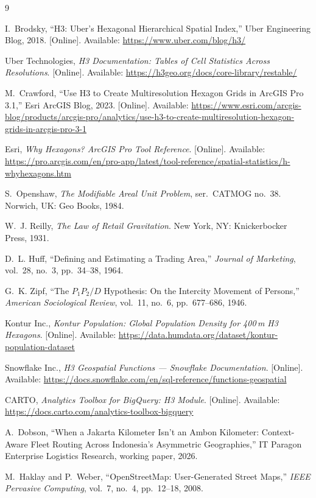 \documentclass[11pt,a4paper,twocolumn]{article}
\begin{document}
\clearpage
\begin{thebibliography}{9}
\small

I.~Brodsky,
``H3: Uber's Hexagonal Hierarchical Spatial Index,''
Uber Engineering Blog, 2018.
[Online]. Available: \url{https://www.uber.com/blog/h3/}

Uber Technologies,
\emph{H3 Documentation: Tables of Cell Statistics Across Resolutions}.
[Online]. Available: \url{https://h3geo.org/docs/core-library/restable/}

M.~Crawford,
``Use H3 to Create Multiresolution Hexagon Grids in ArcGIS Pro 3.1,''
Esri ArcGIS Blog, 2023.
[Online]. Available:
\url{https://www.esri.com/arcgis-blog/products/arcgis-pro/analytics/use-h3-to-create-multiresolution-hexagon-grids-in-arcgis-pro-3-1}

Esri,
\emph{Why Hexagons? ArcGIS Pro Tool Reference}.
[Online]. Available:
\url{https://pro.arcgis.com/en/pro-app/latest/tool-reference/spatial-statistics/h-whyhexagons.htm}

S.~Openshaw,
\emph{The Modifiable Areal Unit Problem}, ser.\ CATMOG no.~38.
Norwich, UK: Geo Books, 1984.

W.~J. Reilly,
\emph{The Law of Retail Gravitation}.
New York, NY: Knickerbocker Press, 1931.

D.~L. Huff,
``Defining and Estimating a Trading Area,''
\emph{Journal of Marketing}, vol.~28, no.~3, pp.~34--38, 1964.

G.~K. Zipf,
``The $P_1 P_2 / D$ Hypothesis: On the Intercity Movement of Persons,''
\emph{American Sociological Review}, vol.~11, no.~6, pp.~677--686, 1946.

Kontur Inc.,
\emph{Kontur Population: Global Population Density for 400\,m H3 Hexagons}.
[Online]. Available: \url{https://data.humdata.org/dataset/kontur-population-dataset}

Snowflake Inc.,
\emph{H3 Geospatial Functions --- Snowflake Documentation}.
[Online]. Available:
\url{https://docs.snowflake.com/en/sql-reference/functions-geospatial}

CARTO,
\emph{Analytics Toolbox for BigQuery: H3 Module}.
[Online]. Available: \url{https://docs.carto.com/analytics-toolbox-bigquery}

A.~Dobson,
``When a Jakarta Kilometer Isn't an Ambon Kilometer: Context-Aware Fleet
Routing Across Indonesia's Asymmetric Geographies,''
IT Paragon Enterprise Logistics Research, working paper, 2026.

M.~Haklay and P.~Weber,
``OpenStreetMap: User-Generated Street Maps,''
\emph{IEEE Pervasive Computing}, vol.~7, no.~4, pp.~12--18, 2008.

\end{thebibliography}
\end{document}
